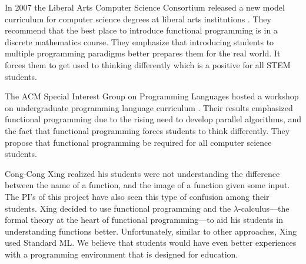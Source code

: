 In 2007 the Liberal Arts Computer Science Consortium released a new
model curriculum for computer science degrees at liberal arts
institutions \cite{LiberalArtsComputerScienceConsortium:2007}.  They
recommend that the best place to introduce functional programming is
in a discrete mathematics course.  They emphasize that introducing
students to multiple programming paradigms better prepares them for
the real world.  It forces them to get used to thinking differently
which is a positive for all STEM students.

The ACM Special Interest Group on Programming Languages hosted a
workshop on undergraduate programming language curriculum
\cite{Allen:2008}.  Their results emphasized functional programming
due to the rising need to develop parallel algorithms, and the fact
that functional programming forces students to think differently.
They propose that functional programming be required for all computer
science students.

Cong-Cong Xing \cite{Xing:2008} realized his students were not
understanding the difference between the name of a function, and the
image of a function given some input.  The PI's of this project have
also seen this type of confusion among their students.  Xing decided
to use functional programming and the $\lambda$-calculus---the formal
theory at the heart of functional programming---to aid his students
in understanding functions better. Unfortunately, similar to other
approaches, Xing used Standard ML.  We believe that students would have
even better experiences with a programming environment that is
designed for education.

